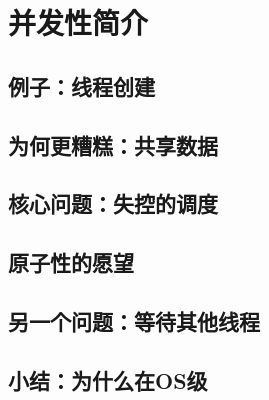 \chapter{并发性简介}
\thispagestyle{empty}



\section{例子：线程创建}

\section{为何更糟糕：共享数据}

\section{核心问题：失控的调度}


\section{原子性的愿望}

\section{另一个问题：等待其他线程}


\section{小结：为什么在OS级}

